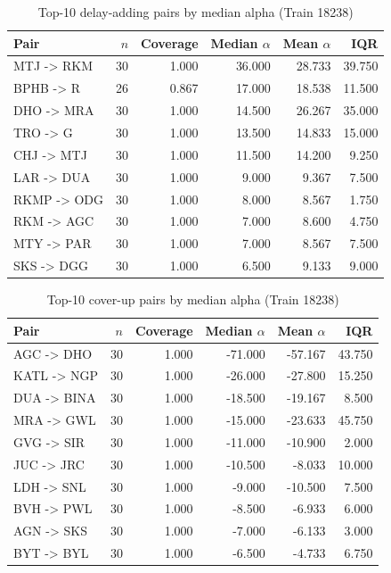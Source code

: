 \begin{table}[H]
\centering
\small
\caption{Top-10 delay-adding pairs by median alpha (Train 18238)}
\label{tab:app_top10_median_add}
\begin{tabular}{p{} r r r r r}
\toprule
Pair & $n$ & Coverage & Median $\alpha$ & Mean $\alpha$ & IQR \\
\midrule
MTJ -> RKM & 30 & 1.000 & 36.000 & 28.733 & 39.750 \\
BPHB -> R & 26 & 0.867 & 17.000 & 18.538 & 11.500 \\
DHO -> MRA & 30 & 1.000 & 14.500 & 26.267 & 35.000 \\
TRO -> G & 30 & 1.000 & 13.500 & 14.833 & 15.000 \\
CHJ -> MTJ & 30 & 1.000 & 11.500 & 14.200 & 9.250 \\
LAR -> DUA & 30 & 1.000 & 9.000 & 9.367 & 7.500 \\
RKMP -> ODG & 30 & 1.000 & 8.000 & 8.567 & 1.750 \\
RKM -> AGC & 30 & 1.000 & 7.000 & 8.600 & 4.750 \\
MTY -> PAR & 30 & 1.000 & 7.000 & 8.567 & 7.500 \\
SKS -> DGG & 30 & 1.000 & 6.500 & 9.133 & 9.000 \\
\bottomrule
\end{tabular}
\end{table}

\begin{table}[H]
\centering
\small
\caption{Top-10 cover-up pairs by median alpha (Train 18238)}
\label{tab:app_top10_median_cover}
\begin{tabular}{p{} r r r r r}
\toprule
Pair & $n$ & Coverage & Median $\alpha$ & Mean $\alpha$ & IQR \\
\midrule
AGC -> DHO & 30 & 1.000 & -71.000 & -57.167 & 43.750 \\
KATL -> NGP & 30 & 1.000 & -26.000 & -27.800 & 15.250 \\
DUA -> BINA & 30 & 1.000 & -18.500 & -19.167 & 8.500 \\
MRA -> GWL & 30 & 1.000 & -15.000 & -23.633 & 45.750 \\
GVG -> SIR & 30 & 1.000 & -11.000 & -10.900 & 2.000 \\
JUC -> JRC & 30 & 1.000 & -10.500 & -8.033 & 10.000 \\
LDH -> SNL & 30 & 1.000 & -9.000 & -10.500 & 7.500 \\
BVH -> PWL & 30 & 1.000 & -8.500 & -6.933 & 6.000 \\
AGN -> SKS & 30 & 1.000 & -7.000 & -6.133 & 3.000 \\
BYT -> BYL & 30 & 1.000 & -6.500 & -4.733 & 6.750 \\
\bottomrule
\end{tabular}
\end{table}


